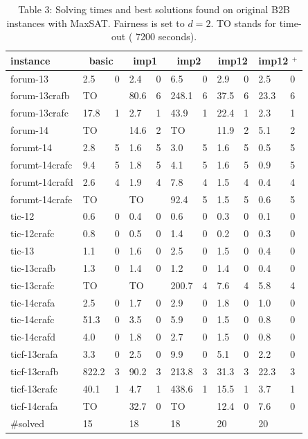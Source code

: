 \documentclass[10pt]{article}
\begin{document}
\begin{table}[h]
\begin{center}
\captionsetup{labelformat=empty}
\caption{Table 3: Solving times and best solutions found on original B2B instances with MaxSAT. Fairness is set to $d=2$. TO stands for time-out ( 7200 seconds).}
\begin{tabular}{|l|l|l|l|l|l|l|l|l|l|l|}
\hline
instance & \multicolumn{2}{|c|}{basic} & \multicolumn{2}{|c|}{imp1} & \multicolumn{2}{|c|}{imp2} & \multicolumn{2}{|c|}{imp12} & \multicolumn{2}{|c|}{imp12 ${ }^{+}$} \\
\hline
forum-13 & 2.5 & 0 & 2.4 & 0 & 6.5 & 0 & 2.9 & 0 & 2.5 & 0 \\
\hline
forum-13crafb & TO &  & 80.6 & 6 & 248.1 & 6 & 37.5 & 6 & 23.3 & 6 \\
\hline
forum-13crafc & 17.8 & 1 & 2.7 & 1 & 43.9 & 1 & 22.4 & 1 & 2.3 & 1 \\
\hline
forum-14 & TO &  & 14.6 & 2 & TO &  & 11.9 & 2 & 5.1 & 2 \\
\hline
forumt-14 & 2.8 & 5 & 1.6 & 5 & 3.0 & 5 & 1.6 & 5 & 0.5 & 5 \\
\hline
forumt-14crafc & 9.4 & 5 & 1.8 & 5 & 4.1 & 5 & 1.6 & 5 & 0.9 & 5 \\
\hline
forumt-14crafd & 2.6 & 4 & 1.9 & 4 & 7.8 & 4 & 1.5 & 4 & 0.4 & 4 \\
\hline
forumt-14crafe & TO &  & TO &  & 92.4 & 5 & 1.5 & 5 & 0.6 & 5 \\
\hline
tic-12 & 0.6 & 0 & 0.4 & 0 & 0.6 & 0 & 0.3 & 0 & 0.1 & 0 \\
\hline
tic-12crafc & 0.8 & 0 & 0.5 & 0 & 1.4 & 0 & 0.2 & 0 & 0.3 & 0 \\
\hline
tic-13 & 1.1 & 0 & 1.6 & 0 & 2.5 & 0 & 1.5 & 0 & 0.4 & 0 \\
\hline
tic-13crafb & 1.3 & 0 & 1.4 & 0 & 1.2 & 0 & 1.4 & 0 & 0.4 & 0 \\
\hline
tic-13crafc & TO &  & TO &  & 200.7 & 4 & 7.6 & 4 & 5.8 & 4 \\
\hline
tic-14crafa & 2.5 & 0 & 1.7 & 0 & 2.9 & 0 & 1.8 & 0 & 1.0 & 0 \\
\hline
tic-14crafc & 51.3 & 0 & 3.5 & 0 & 5.9 & 0 & 1.5 & 0 & 0.8 & 0 \\
\hline
tic-14crafd & 4.0 & 0 & 1.8 & 0 & 2.7 & 0 & 1.5 & 0 & 0.8 & 0 \\
\hline
ticf-13crafa & 3.3 & 0 & 2.5 & 0 & 9.9 & 0 & 5.1 & 0 & 2.2 & 0 \\
\hline
ticf-13crafb & 822.2 & 3 & 90.2 & 3 & 213.8 & 3 & 31.3 & 3 & 22.3 & 3 \\
\hline
ticf-13crafc & 40.1 & 1 & 4.7 & 1 & 438.6 & 1 & 15.5 & 1 & 3.7 & 1 \\
\hline
ticf-14crafa & TO &  & 32.7 & 0 & TO &  & 12.4 & 0 & 7.6 & 0 \\
\hline
\#solved & 15 &  & 18 &  & 18 &  & 20 &  & 20 &  \\
\hline
\end{tabular}
\end{center}
\end{table}
\end{document}
